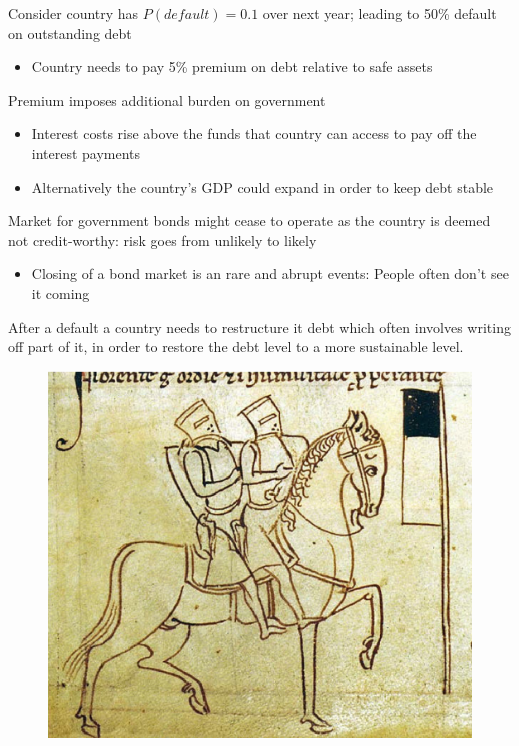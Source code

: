 \documentclass{beamer}
\begin{document}
\begin{frame}
  Consider country has $P(default)=0.1$ over next year; leading to 50\% default on outstanding debt
  \begin{itemize}
    \item Country needs to pay 5\% premium on debt relative to safe assets
  \end{itemize}
  \medskip
  Premium imposes additional burden on government
  \begin{itemize}
    \item Interest costs rise above the funds that country can access to pay off the interest payments
    \item Alternatively the country's GDP could expand in order to keep debt stable
  \end{itemize}
  Market for government bonds might cease to operate as the country is deemed not credit-worthy: risk goes from unlikely to likely
  \begin{itemize}
    \item Closing of a bond market is an rare and abrupt events: People often don't see it coming
  \end{itemize}
  After a default a country needs to restructure it debt which often involves writing off part of it, in order to restore the debt level to a more sustainable level. 
\end{frame}

\begin{frame}
  \begin{figure}
    \includegraphics[scale=.5]{templars.eps}
  \end{figure}
\end{frame}
\end{document}
